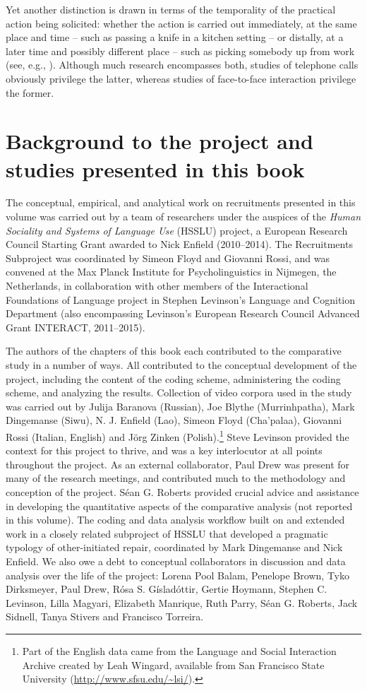 \documentclass[output=paper,modfonts,nonflat]{langsci/langscibook}
\begin{document}
Yet another distinction is drawn in terms of the temporality of the practical action being solicited: whether the action is carried out immediately, at the same place and time -- such as passing a knife in a kitchen setting -- or distally, at a later time and possibly different place -- such as picking somebody up from work (see, e.g., \citealt{Lindström1999}). Although much research encompasses both, studies of telephone calls obviously privilege the latter, whereas studies of face-to-face interaction privilege the former.

\section{Background to the project and studies presented in this book}\label{sec:intro:3}

The conceptual, empirical, and analytical work on recruitments presented in this volume was carried out by a team of researchers under the auspices of the \textit{Human Sociality and Systems of Language Use} (HSSLU) project, a European Research Council Starting Grant awarded to Nick Enfield (2010--2014). The Recruitments Subproject was coordinated by Simeon Floyd and Giovanni Rossi, and was convened at the Max Planck Institute for Psycholinguistics in Nijmegen, the Netherlands, in collaboration with other members of the Interactional Foundations of Language project in Stephen Levinson’s Language and Cognition Department (also encompassing Levinson’s European Research Council Advanced Grant INTERACT, 2011--2015).

The authors of the chapters of this book each contributed to the comparative study in a number of ways. All contributed to the conceptual development of the project, including the content of the coding scheme, administering the coding scheme, and analyzing the results. Collection of video corpora used in the study was carried out by Julija Baranova (Russian), Joe Blythe (Murrinhpatha), Mark Dingemanse (Siwu), N. J. Enfield (Lao), Simeon Floyd (Cha’palaa), Giovanni Rossi (Italian, English) and Jörg Zinken (Polish).\footnote{Part of the English data came from the Language and Social Interaction Archive created by Leah Wingard, available from San Francisco State University (\url{http://www.sfsu.edu/~lsi/}).} Steve Levinson provided the context for this project to thrive, and was a key interlocutor at all points throughout the project. As an external collaborator, Paul Drew was present for many of the research meetings, and contributed much to the methodology and conception of the project. Séan G. Roberts provided crucial advice and assistance in developing the quantitative aspects of the comparative analysis (not reported in this volume). The coding and data analysis workflow built on and extended work in a closely related subproject of HSSLU that developed a pragmatic typology of other-initiated repair, coordinated by Mark Dingemanse and Nick Enfield. We also owe a debt to conceptual collaborators in discussion and data analysis over the life of the project: Lorena Pool Balam, Penelope Brown, Tyko Dirksmeyer, Paul Drew, Rósa S. Gísladóttir, Gertie Hoymann, Stephen C. Levinson, Lilla Magyari, Elizabeth Manrique, Ruth Parry, Séan G. Roberts, Jack Sidnell, Tanya Stivers and Francisco Torreira.
\end{document}
